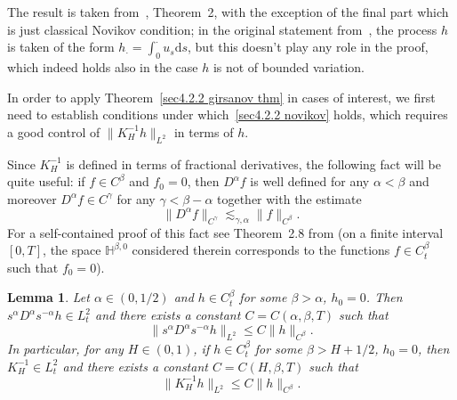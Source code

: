 \documentclass[10pt]{article}
\newcommand{\mathd}{\mathrm{d}}
\newtheorem{lemma}{Lemma}
\begin{document}
The result is taken from~{\cite{nualartouknine}}, Theorem~2, with the
exception of the final part which is just classical Novikov condition; in the
original statement from~{\cite{nualartouknine}}, the process $h$ is taken of
the form $h_{\cdot} = \int_0^{\cdot} u_s \mathd s$, but this doesn't play any
role in the proof, which indeed holds also in the case $h$ is not of bounded
variation.

In order to apply Theorem~\ref{sec4.2.2 girsanov thm} in cases of interest, we
first need to establish conditions under which~{\eqref{sec4.2.2 novikov}}
holds, which requires a good control of $\| K^{- 1}_H h \|_{L^2}$ in terms of
$h$.

Since $K^{- 1}_H$ is defined in terms of fractional derivatives, the following
fact will be quite useful: if $f \in C^{\beta}$ and $f_0 = 0$, then
$D^{\alpha} f$ is well defined for any $\alpha < \beta$ and moreover
$D^{\alpha} f \in C^{\gamma}$ for any $\gamma < \beta - \alpha$ together with
the estimate
\begin{equation}
  \| D^{\alpha} f \|_{C^{\gamma}} \lesssim_{\gamma, \alpha} \| f
  \|_{C^{\beta}} . \label{sec4.2.2 holder fractional derivative}
\end{equation}
For a self-contained proof of this fact see Theorem~2.8 from {\cite{picard}}
(on a finite interval $[0, T]$, the space $\mathbb{H}^{\beta, 0}$ considered
therein corresponds to the functions $f \in C^{\beta}_t$ such that $f_0 = 0$).

\begin{lemma}
  \label{sec4.2.2 lemma fractional derivative}Let $\alpha \in (0, 1 / 2)$ and
  $h \in C_t^{\beta}$ for some $\beta > \alpha$, $h_0 = 0$. Then $s^{\alpha}
  D^{\alpha} s^{- \alpha} h \in L_t^2$ and there exists a constant $C = C
  (\alpha, \beta, T)$ such that
  \begin{equation}
    \| s^{\alpha} D^{\alpha} s^{- \alpha} h \|_{L^2} \leqslant C \| h
    \|_{C^{\beta}} . \label{sec4.2.2 estimate fractional derivative 1}
  \end{equation}
  In particular, for any $H \in (0, 1)$, if $h \in C_t^{\beta}$ for some
  $\beta > H + 1 / 2$, $h_0 = 0$, then $K^{- 1}_H \in L_t^2$ and there exists
  a constant $C = C (H, \beta, T)$ such that
  \begin{equation}
    \| K_H^{- 1} h \|_{L^2} \leqslant C \| h \|_{C^{\beta}} . \label{sec4.2.2
    estimate fractional derivative 2}
  \end{equation}
\end{lemma}
\end{document}
